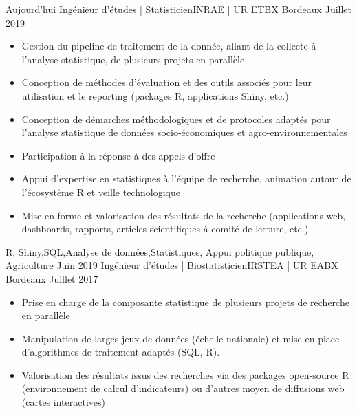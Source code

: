 \documentclass[localFont,alternative]{yaac-another-awesome-cv}
\begin{document}
\begin{experiences}
\experience
    {Aujourd'hui}   {Ingénieur d'études | Statisticien}{INRAE | UR ETBX }{Bordeaux}
    {Juillet 2019} {
                      \begin{itemize}                    
                        \item Gestion du pipeline de traitement de la donnée, allant de la collecte à l'analyse statistique, de plusieurs projets en parallèle.
                        \item Conception de méthodes d'évaluation et des outils associés pour leur utilisation et le reporting (packages R, applications Shiny, etc.)
                        \item Conception de démarches méthodologiques et de protocoles adaptés pour l’analyse statistique de données socio-économiques et agro-environnementales
                        \item Participation à la réponse à des appels d’offre
                        \item Appui d'expertise en statistiques à l'équipe de recherche, animation autour de l'écosystème R et veille technologique                                                                         
                        \item Mise en forme et valorisation des résultats de la recherche (applications web, dashboards, rapports, articles scientifiques à comité de lecture, etc.)
                      \end{itemize}
                    }
                    {R, Shiny,SQL,Analyse de données,Statistiques, Appui politique publique, Agriculture}
  \emptySeparator
  \experience
    {Juin 2019}   {Ingénieur d'études | Biostatisticien}{IRSTEA | UR EABX }{Bordeaux}
    {Juillet 2017} {
                      \begin{itemize}                    
                        \item Prise en charge de la composante statistique de plusieurs projets de recherche en parallèle
                        \item Manipulation de larges jeux de données (échelle nationale) et mise en place d'algorithmes de traitement adaptés (SQL, R).
                        \item Valorisation des résultats issus des recherches via des packages open-source R (environnement de calcul d'indicateurs) ou d'autres moyen de diffusions web (cartes interactives)

\end{itemize}}
\end{experiences}
\end{document}
